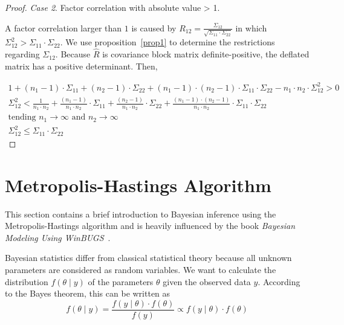 \documentclass[11pt,fleqn]{book} %
\begin{document}
\begin{proof}
	\emph{Case 2}. Factor correlation with absolute value > 1.
	\begin{adjustwidth}{1cm}{0pt}
		A factor correlation larger than $1$ is caused by 
		$R_{12} = \frac{\Sigma_{12}}{\sqrt{\Sigma_{11} \cdot \Sigma_{22}}}$
		in which $\Sigma_{12}^2 > \Sigma_{11} \cdot \Sigma_{22}$.
		We use proposition~\ref{prop1} to determine the restrictions regarding 
		$\Sigma_{12}$. Because $\widehat{R}$ is covariance block matrix 
		definite-positive, the deflated matrix has a positive determinant. 
		Then,
	\end{adjustwidth}
	\begin{displaymath}
		\begin{array}{l}
			1 + (n_1-1) \cdot \Sigma_{11} + (n_2-1) \cdot \Sigma_{22} +
			(n_1-1) \cdot (n_2-1) \cdot \Sigma_{11} \cdot \Sigma_{22} -
			n_1 \cdot n_2 \cdot \Sigma_{12}^2 > 0
			\\
			\Sigma_{12}^2 <
			\frac{1}{n_1 \cdot n_2} +
			\frac{(n_1-1)}{n_1 \cdot n_2} \cdot \Sigma_{11} +
			\frac{(n_2-1)}{n_1 \cdot n_2} \cdot \Sigma_{22} +
			\frac{(n_1-1) \cdot (n_2-1)}{n_1 \cdot n_2} \cdot \Sigma_{11} \cdot \Sigma_{22}
			\\
			\text{tending } n_1 \to \infty \text{ and } n_2 \to \infty
			\\
			\Sigma_{12}^2 \le \Sigma_{11} \cdot \Sigma_{22}
		\end{array}
	\end{displaymath}
\end{proof}

\section{Metropolis-Hastings Algorithm}
\label{ap:mha}

This section contains a brief introduction to Bayesian inference using 
the Metropolis-Hastings algorithm and is heavily influenced by the book 
\emph{Bayesian Modeling Using WinBUGS}~\cite{ntzoufras:2009}.

Bayesian statistics differ from classical statistical theory because all 
unknown parameters are considered as random variables. We want to calculate 
the distribution $f(\theta \mid y)$ of the parameters $\theta$ given the 
observed data $y$. According to the Bayes theorem, this can be written as
\begin{displaymath}
	f(\theta \mid y) = \frac{f(y \mid \theta) \cdot f(\theta)}{f(y)} \propto f(y \mid \theta) \cdot f(\theta)
\end{displaymath}
\end{document}
